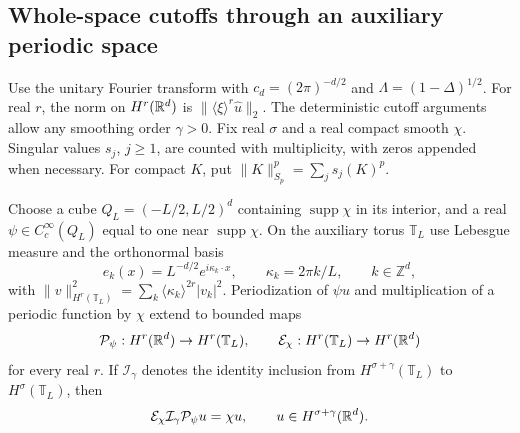 \subsection{Whole-space cutoffs through an auxiliary periodic space}

Use the unitary Fourier transform with $c_d = (2\pi)^{-d/2}$ and $\Lambda =
(1-\Delta)^{1/2}$. For real $r$, the norm on $H^r(\mathbb{R}^d)$ is
$\|\langle\xi\rangle^r\widehat{u}\|_2$. The deterministic cutoff arguments allow
any smoothing order $\gamma > 0$. Fix real $\sigma$ and a real compact smooth
$\chi$. Singular values $s_j$, $j \ge 1$, are counted with multiplicity, with
zeros appended when necessary. For compact $K$, put $\|K\|_{S_p}^p = \sum_j
s_j(K)^p$.

\begin{lemma}\label{L:cutoff-factorization}
  Choose a cube $Q_L = (-L/2,L/2)^d$ containing $\operatorname{supp}\chi$ in its
  interior, and a real $\psi \in C_c^\infty(Q_L)$ equal to one near
  $\operatorname{supp}\chi$. On the auxiliary torus $\mathbb{T}_L$ use Lebesgue
  measure and the orthonormal basis
  \[
    e_k(x)=L^{-d/2}e^{i\kappa_k\cdot x},\qquad
    \kappa_k=2\pi k/L,\qquad k \in \mathbb{Z}^d,
  \]
  with $\|v\|_{H^r(\mathbb{T}_L)}^2 = \sum_k\langle\kappa_k\rangle^{2r}|v_k|^2$.
  Periodization of $\psi u$ and multiplication of a periodic function by $\chi$
  extend to bounded maps
  \begin{equation}\label{E:cutoff-periodic-maps}
    \mathcal{P}_\psi:H^r(\mathbb{R}^d)\to H^r(\mathbb{T}_L),\qquad
    \mathcal{E}_\chi:H^r(\mathbb{T}_L)\to H^r(\mathbb{R}^d)
  \end{equation}
  for every real $r$. If $\mathcal{I}_\gamma$ denotes the identity inclusion
  from $H^{\sigma+\gamma}(\mathbb{T}_L)$ to $H^\sigma(\mathbb{T}_L)$, then
  \begin{equation}\label{E:cutoff-whole-space-recovery}
    \mathcal{E}_\chi\mathcal{I}_\gamma\mathcal{P}_\psi u=\chi u,
    \qquad u \in H^{\sigma+\gamma}(\mathbb{R}^d).
  \end{equation}
\end{lemma}

